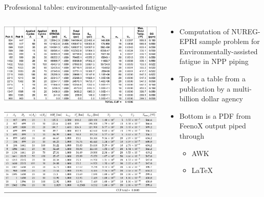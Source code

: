 \documentclass[
  ignorenonframetext,
  aspectratio=169,
]{beamer}
\providecommand{\tightlist}{%
  \setlength{\itemsep}{0pt}\setlength{\parskip}{0pt}}
\begin{document}
\begin{frame}{Professional tables: environmentally-assisted fatigue}
\protect\hypertarget{professional-tables-environmentally-assisted-fatigue}{}
\begin{columns}[T]
\begin{column}{0.55\textwidth}
\includegraphics{nureg.png}

\includegraphics{cne.png}
\end{column}

\begin{column}{0.45\textwidth}
\vspace{1cm}

\begin{itemize}
\tightlist
\item
  Computation of NUREG-EPRI sample problem for Environmentally-assisted
  fatigue in NPP piping
\end{itemize}

\bigskip

\begin{itemize}
\tightlist
\item
  Top is a table from a publication by a multi-billion dollar agency
\item
  Bottom is a PDF from FeenoX output piped through

  \begin{itemize}
  \tightlist
  \item
    AWK
  \item
    \LaTeX
  \end{itemize}
\end{itemize}
\end{column}
\end{columns}
\end{frame}
\end{document}
